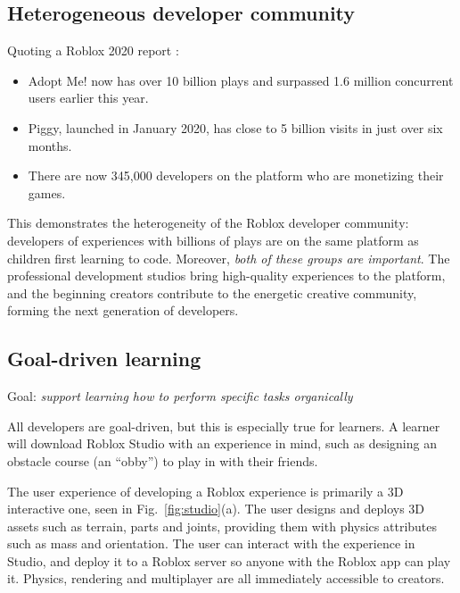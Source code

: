 \documentclass[acmsmall]{acmart}
\begin{document}
\subsection{Heterogeneous developer community}

Quoting a Roblox 2020 report \cite{RobloxDevelopers}:
\begin{itemize}
\item Adopt Me! now has over 10 billion plays and surpassed 1.6 million concurrent users earlier this year.
\item Piggy, launched in January 2020, has close to 5 billion visits in just over six months.
\item There are now 345,000 developers on the platform who are monetizing their games.
\end{itemize}
This demonstrates the heterogeneity of the Roblox developer community:
developers of experiences with billions of plays are on the same
platform as children first learning to code. Moreover, \emph{both of
these groups are important}. The professional development studios
bring high-quality experiences to the platform, and the beginning creators
contribute to the energetic creative community, forming the next generation of developers.

\subsection{Goal-driven learning}

Goal: \emph{support learning how to perform specific tasks organically}

All developers are goal-driven, but this is especially true for
learners. A learner will download Roblox Studio with an
experience in mind, such as designing an obstacle course (an ``obby'')
to play in with their friends.

The user experience of developing a Roblox experience is primarily a
3D interactive one, seen in Fig.~\ref{fig:studio}(a). The user designs
and deploys 3D assets such as terrain, parts and joints, providing
them with physics attributes such as mass and orientation. The user
can interact with the experience in Studio, and deploy it to a Roblox
server so anyone with the Roblox app can play it. Physics, rendering
and multiplayer are all immediately accessible to creators.
\end{document}
